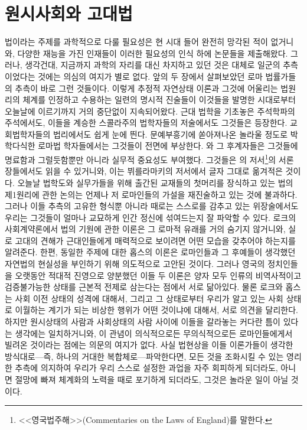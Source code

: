 \chapter{원시사회와 고대법}

법이라는 주제를 과학적으로 다룰 필요성은 현 시대 들어
완전히 망각된 적이 없거니와,
다양한 재능을 가진 인재들이
이러한 필요성의 인식 하에 논문들을 제출해왔다.
그러나, 생각건대,
지금까지 과학의 자리를 대신 차지하고 있던 것은
대체로 일군의 추측이었다는 것에는 의심의 여지가 별로 없다.
앞의 두 장에서 살펴보았던 로마 법률가들의 추측이 바로 그런 것들이다.
이렇게 추정적 자연상태 이론과
그것에 어울리는 법원리의 체계를 인정하고 수용하는 일련의 명시적 진술들이
이것들을 발명한 시대로부터 오늘날에 이르기까지 거의 중단없이 지속되어왔다.
근대 법학을 기초놓은 주석학파의 주석에서도,
이들을 계승한 스콜라주의 법학자들의 저술에서도 그것들은 등장한다.
교회법학자들의 법리에서도 쉽게 눈에 띈다.
문예부흥기에 쏟아져나온 놀라울 정도로 박학다식한
로마법 학자들에서는
그것들이 전면에 부상한다.
와 그 후계자들은 그것들에 명료함과 그럴듯함뿐만 아니라
실무적 중요성도 부여했다.
그것들은 의 저서\footnote{%
  <<영국법주해>>(Commentaries on the Laws of England)를 말한다.
}의 서론 장들에서도 읽을 수 있거니와,
이는 뷔를라마키의 저서에서
글자 그대로 옮겨적은 것이다.
오늘날 법학도와 실무가들을 위해 출간된 교재들의 첫머리를 장식하고 있는
법의 제1원리에 관한 논의는 언제나 저 로마인들의 가설을
재진술하고 있는 것에 불과하다.
그러나 이들 추측의 고유한 형식뿐 아니라
때로는 스스로를 감추고 있는 위장술에서도
우리는 그것들이 얼마나 교묘하게 인간 정신에 섞여드는지 잘 파악할 수 있다.
로크의 사회계약론에서 법의 기원에 관한 이론은
그 로마적 유래를 거의 숨기지 않거니와,
실로 고대의 견해가 근대인들에게 매력적으로 보이려면
어떤 모습을 갖추어야 하는지를 알려준다.
한편, 동일한 주제에 대한 홉스의 이론은
로마인들과 그 후예들이 생각했던 자연법의 현실성을
부인하기 위해 의도적으로 고안된 것이다.
그러나 영국의 정치인들을 오랫동안 적대적 진영으로 양분했던
이들 두 이론은 양자 모두 인류의 비역사적이고 검증불가능한 상태를
근본적 전제로 삼는다는 점에서 서로 닮아있다.
물론 로크와 홉스는 사회 이전 상태의 성격에 대해서, 그리고
그 상태로부터 우리가 알고 있는 사회 상태로 이월하는 계기가 되는
비상한 행위가 어떤 것이냐에 대해서, 서로 의견을 달리한다.
하지만 원시상태의 사람과 사회상태의 사람 사이에
이들을 갈라놓는 커다란 틈이 있다는 생각에는 일치하거니와,
이 관념이 의식적으로든 무의식적으로든
로마인들에게서 빌려온 것이라는 점에는 의문의 여지가 없다.
사실 법현상을 이들 이론가들이 생각한 방식대로---즉, 하나의 거대한
복합체로---파악한다면, 
모든 것을 조화시킬 수 있는 영리한 추측에 의지하여
우리가 우리 스스로 설정한 과업을 자주 회피하게 되더라도,
아니면 절망에 빠져 체계화의 노력을 때로 포기하게 되더라도,
그것은 놀라운 일이 아닐 것이다.


